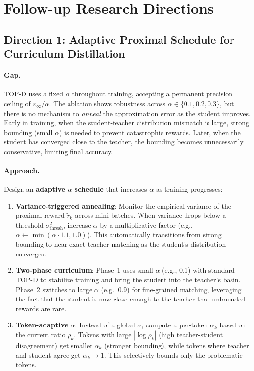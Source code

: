 \documentclass[11pt,a4paper]{article}
\begin{document}
\section{Follow-up Research Directions}

\subsection{Direction 1: Adaptive Proximal Schedule for Curriculum Distillation}

\paragraph{Gap.} TOP-D uses a fixed $\alpha$ throughout training, accepting a permanent precision ceiling of $\varepsilon_\infty / \alpha$. The ablation shows robustness across $\alpha \in \{0.1, 0.2, 0.3\}$, but there is no mechanism to \emph{anneal} the approximation error as the student improves. Early in training, when the student-teacher distribution mismatch is large, strong bounding (small $\alpha$) is needed to prevent catastrophic rewards. Later, when the student has converged close to the teacher, the bounding becomes unnecessarily conservative, limiting final accuracy.

\paragraph{Approach.} Design an \textbf{adaptive $\alpha$ schedule} that increases $\alpha$ as training progresses:
\begin{enumerate}
\item \textbf{Variance-triggered annealing}: Monitor the empirical variance of the proximal reward $\tilde{r}_k$ across mini-batches. When variance drops below a threshold $\sigma^2_{\mathrm{thresh}}$, increase $\alpha$ by a multiplicative factor (e.g., $\alpha \leftarrow \min(\alpha \cdot 1.1, 1.0)$). This automatically transitions from strong bounding to near-exact teacher matching as the student's distribution converges.
\item \textbf{Two-phase curriculum}: Phase~1 uses small $\alpha$ (e.g., 0.1) with standard TOP-D to stabilize training and bring the student into the teacher's basin. Phase~2 switches to large $\alpha$ (e.g., 0.9) for fine-grained matching, leveraging the fact that the student is now close enough to the teacher that unbounded rewards are rare.
\item \textbf{Token-adaptive $\alpha$}: Instead of a global $\alpha$, compute a per-token $\alpha_k$ based on the current ratio $\rho_k$. Tokens with large $|\log \rho_k|$ (high teacher-student disagreement) get smaller $\alpha_k$ (stronger bounding), while tokens where teacher and student agree get $\alpha_k \to 1$. This selectively bounds only the problematic tokens.
\end{enumerate}
\end{document}
